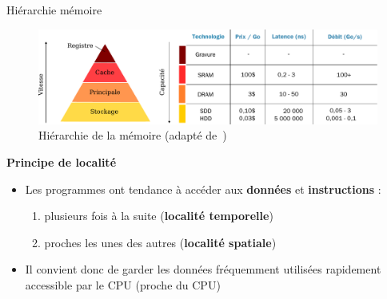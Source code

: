 \documentclass[8pt]{beamer}
\begin{document}
\begin{frame}{Hiérarchie mémoire}

    \begin{figure}
        \centering
        \includegraphics[width=\linewidth]{figures/hierarchy_memory.pdf}
        \caption{Hiérarchie de la mémoire (adapté de~\cite{harris2021digital})}
    \end{figure}

    \textbf{Principe de localité}
    \begin{itemize}
        \item Les programmes ont tendance à accéder aux \textbf{données} et
              \textbf{instructions} :
              \begin{enumerate}
                  \item plusieurs fois \`a la suite (\textbf{localité
                            temporelle})
                  \item proches les unes des autres (\textbf{localité
                            spatiale})
              \end{enumerate}
        \item Il convient donc de garder les données fréquemment utilisées
              rapidement
              accessible par le CPU (proche du CPU)
    \end{itemize}
\end{frame}
\end{document}
